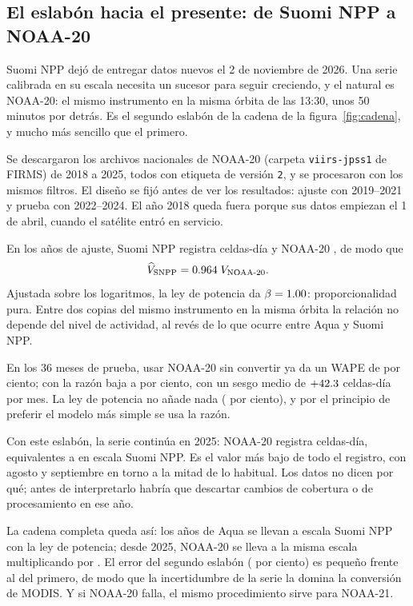 \subsection{El eslabón hacia el presente: de Suomi NPP a NOAA-20}\label{sec:peru-noaa20}

Suomi NPP dejó de entregar datos nuevos el 2 de noviembre de 2026. Una serie calibrada en su
escala necesita un sucesor para seguir creciendo, y el natural es NOAA-20: el mismo instrumento
en la misma órbita de las 13:30, unos 50 minutos por detrás. Es el segundo eslabón de la cadena
de la figura~\ref{fig:cadena}, y mucho más sencillo que el primero.

Se descargaron los archivos nacionales de NOAA-20 (carpeta \texttt{viirs-jpss1} de FIRMS) de
2018 a 2025, todos con etiqueta de versión \texttt{2}, y se procesaron con los mismos filtros. El
diseño se fijó antes de ver los resultados: ajuste con 2019--2021 y prueba con 2022--2024. El año
2018 queda fuera porque sus datos empiezan el 1 de abril, cuando el satélite entró en servicio.

En los años de ajuste, Suomi NPP registra \NveinteAjusteSNPP{} celdas-día y NOAA-20
\NveinteAjusteNveinte, de modo que
\begin{equation}
  \widehat{V}_{\text{SNPP}} = \num{0.964}\;V_{\text{NOAA-20}} .
\end{equation}
Ajustada sobre los logaritmos, la ley de potencia da $\beta = \num{1.00}$: proporcionalidad
pura. Entre dos copias del mismo instrumento en la misma órbita la relación no depende del nivel
de actividad, al revés de lo que ocurre entre Aqua y Suomi NPP.

En los 36 meses de prueba, usar NOAA-20 sin convertir ya da un WAPE de \NveinteWapeSin{} por
ciento; con la razón baja a \NveinteWapeRazon{} por ciento, con un sesgo medio de
$+\num{42.3}$ celdas-día por mes. La ley de potencia no añade nada
(\NveinteWapePot{} por ciento), y por el principio de preferir el modelo más simple se usa la
razón.

Con este eslabón, la serie continúa en 2025: NOAA-20 registra \NveinteTotalVeinticinco{}
celdas-día, equivalentes a \NveinteConvVeinticinco{} en escala Suomi NPP. Es el valor más bajo
de todo el registro, con agosto y septiembre en torno a la mitad de lo habitual. Los datos no
dicen por qué; antes de interpretarlo habría que descartar cambios de cobertura o de
procesamiento en ese año.

\begin{parareto}
La cadena completa queda así: los años de Aqua se llevan a escala Suomi NPP con la ley de
potencia; desde 2025, NOAA-20 se lleva a la misma escala multiplicando por \NveinteRazon. El
error del segundo eslabón (\NveinteWapeRazon{} por ciento) es pequeño frente al del primero, de
modo que la incertidumbre de la serie la domina la conversión de MODIS. Y si NOAA-20 falla, el
mismo procedimiento sirve para NOAA-21.
\end{parareto}

